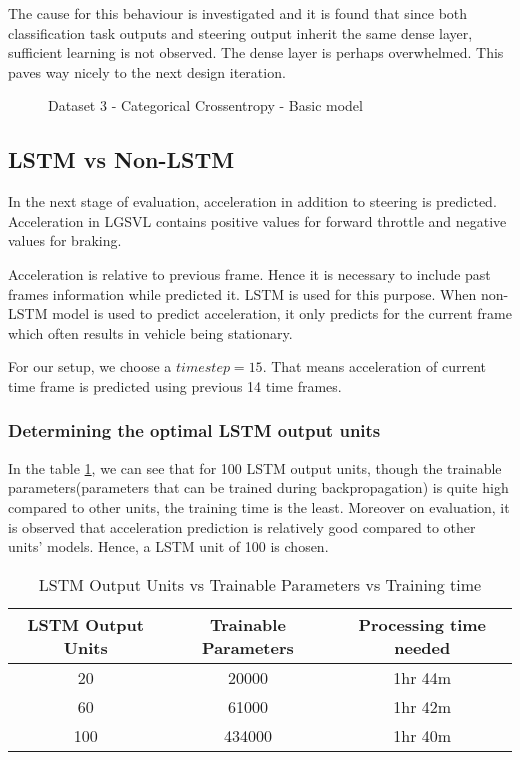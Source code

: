 The cause for this behaviour is investigated and it is found that since both
classification task outputs and steering output inherit the same dense layer, sufficient
learning is not observed. The dense layer is perhaps overwhelmed. This paves way nicely to
the next design iteration.

\begin{figure}[h]
	\centering
    \def\svgwidth{0.8\textwidth}
    \caption{Dataset 3 - Categorical Crossentropy - Basic model}
    \label{fig:ds3categoricalcrossentropybasic}
\end{figure}
%    
\subsection{LSTM vs Non-LSTM}
In the next stage of evaluation, acceleration in addition to steering is predicted.
Acceleration in LGSVL contains positive values for forward throttle and negative values
for braking.

Acceleration is relative to previous frame. Hence it is necessary to include past frames
information while predicted it. LSTM is used for this purpose. When non-LSTM model is used
to predict acceleration, it only predicts for the current frame which often results in
vehicle being stationary.

For our setup, we choose a $timestep = 15$. That means acceleration of current time frame
is predicted using previous 14 time frames.
\subsubsection*{Determining the optimal LSTM output units}
In the table \ref{table:unitsvstime}, we can see that for 100 LSTM output units, though
the trainable parameters(parameters that can be trained during backpropagation) is quite
high compared to other units, the training time is the least.
Moreover on evaluation, it is observed that acceleration prediction is relatively good
compared to other units' models. Hence, a LSTM unit of 100 is chosen.
\begin{table}[h]
    \centering
\begin{tabular}{|c c c|}
    \hline
    LSTM Output Units & Trainable Parameters & Processing time needed \\\hline
    20 & 20000 & 1hr 44m  \\\hline
    60 & 61000 & 1hr 42m \\\hline
    100 & 434000  & 1hr 40m \\\hline
\end{tabular}
\caption{LSTM Output Units vs Trainable Parameters vs Training time}
\label{table:unitsvstime}
\end{table}

